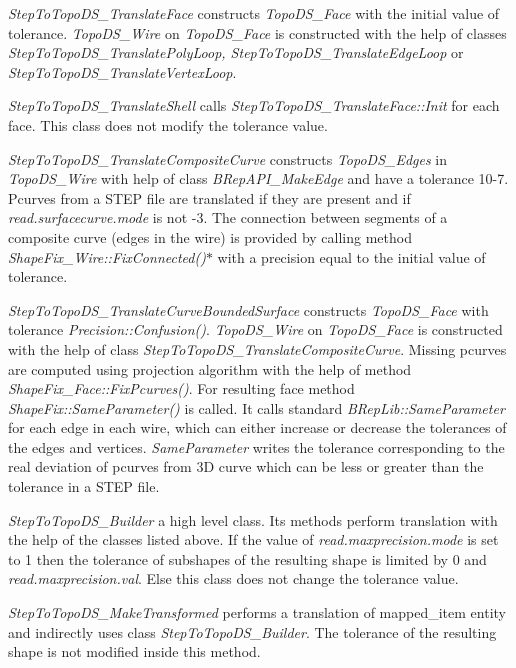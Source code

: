 \begin{DoxyItemize}
\item {\itshape Step\+To\+Topo\+D\+S\+\_\+\+Translate\+Face} constructs {\itshape Topo\+D\+S\+\_\+\+Face} with the initial value of tolerance. {\itshape Topo\+D\+S\+\_\+\+Wire} on {\itshape Topo\+D\+S\+\_\+\+Face} is constructed with the help of classes {\itshape Step\+To\+Topo\+D\+S\+\_\+\+Translate\+Poly\+Loop, Step\+To\+Topo\+D\+S\+\_\+\+Translate\+Edge\+Loop} or {\itshape Step\+To\+Topo\+D\+S\+\_\+\+Translate\+Vertex\+Loop}.
\item {\itshape Step\+To\+Topo\+D\+S\+\_\+\+Translate\+Shell} calls {\itshape Step\+To\+Topo\+D\+S\+\_\+\+Translate\+Face\+::\+Init} for each face. This class does not modify the tolerance value.
\item {\itshape Step\+To\+Topo\+D\+S\+\_\+\+Translate\+Composite\+Curve} constructs {\itshape Topo\+D\+S\+\_\+\+Edges} in {\itshape Topo\+D\+S\+\_\+\+Wire} with help of class {\itshape B\+Rep\+A\+P\+I\+\_\+\+Make\+Edge} and have a tolerance 10-\/7. Pcurves from a S\+T\+EP file are translated if they are present and if {\itshape read.\+surfacecurve.\+mode} is not -\/3. The connection between segments of a composite curve (edges in the wire) is provided by calling method {\itshape Shape\+Fix\+\_\+\+Wire\+::\+Fix\+Connected()$\ast$} with a precision equal to the initial value of tolerance.
\item {\itshape Step\+To\+Topo\+D\+S\+\_\+\+Translate\+Curve\+Bounded\+Surface} constructs {\itshape Topo\+D\+S\+\_\+\+Face} with tolerance {\itshape Precision\+::\+Confusion()}. {\itshape Topo\+D\+S\+\_\+\+Wire} on {\itshape Topo\+D\+S\+\_\+\+Face} is constructed with the help of class {\itshape Step\+To\+Topo\+D\+S\+\_\+\+Translate\+Composite\+Curve}. Missing pcurves are computed using projection algorithm with the help of method {\itshape Shape\+Fix\+\_\+\+Face\+::\+Fix\+Pcurves()}. For resulting face method {\itshape Shape\+Fix\+::\+Same\+Parameter()} is called. It calls standard {\itshape B\+Rep\+Lib\+::\+Same\+Parameter} for each edge in each wire, which can either increase or decrease the tolerances of the edges and vertices. {\itshape Same\+Parameter} writes the tolerance corresponding to the real deviation of pcurves from 3D curve which can be less or greater than the tolerance in a S\+T\+EP file.
\item {\itshape Step\+To\+Topo\+D\+S\+\_\+\+Builder} a high level class. Its methods perform translation with the help of the classes listed above. If the value of {\itshape read.\+maxprecision.\+mode} is set to 1 then the tolerance of subshapes of the resulting shape is limited by 0 and {\itshape read.\+maxprecision.\+val}. Else this class does not change the tolerance value.
\item {\itshape Step\+To\+Topo\+D\+S\+\_\+\+Make\+Transformed} performs a translation of mapped\+\_\+item entity and indirectly uses class {\itshape Step\+To\+Topo\+D\+S\+\_\+\+Builder}. The tolerance of the resulting shape is not modified inside this method.
\end{DoxyItemize}

